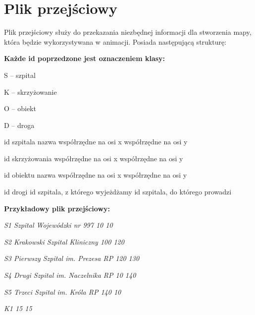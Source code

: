 ﻿\documentclass{article}
\begin{document}
\noindent 
\section{Plik przej\'{s}ciowy}

\noindent Plik przej\'{s}ciowy s{\l}u\.{z}y do przekazania niezb\k{e}dnej informacji dla stworzenia mapy, kt\'{o}ra b\k{e}dzie wykorzystywana w animacji. Posiada nast\k{e}puj\k{a}c\k{a} struktur\k{e}:

\noindent {}

\noindent \textbf{Ka\.{z}de id poprzedzone jest oznaczeniem klasy:}

\noindent {}

\noindent S -- szpital

\noindent K -- skrzy\.{z}owanie

\noindent O -- obiekt

\noindent D -- droga

\noindent {}

\noindent id szpitala {\textbar} nazwa {\textbar} wsp\'{o}{\l}rz\k{e}dne na osi x {\textbar} wsp\'{o}{\l}rz\k{e}dne na osi y

\noindent id skrzy\.{z}owania {\textbar} wsp\'{o}{\l}rz\k{e}dne na osi x {\textbar} wsp\'{o}{\l}rz\k{e}dne na osi y

\noindent id obiektu {\textbar} nazwa {\textbar} wsp\'{o}{\l}rz\k{e}dne na osi x {\textbar} wsp\'{o}{\l}rz\k{e}dne na osi y

\noindent id drogi {\textbar} id szpitala, z kt\'{o}rego wyje\.{z}d\.{z}amy {\textbar} id szpitala, do kt\'{o}rego prowadzi

\noindent {}

\noindent \textbf{Przyk{\l}adowy plik przej\'{s}ciowy:}

\noindent {}

\noindent \textit{S1 {\textbar} Szpital Wojew\'{o}dzki nr 997 {\textbar} 10 {\textbar} 10}

\noindent \textit{S2 {\textbar} Krakowski Szpital Kliniczny {\textbar} 100 {\textbar} 120}

\noindent \textit{S3 {\textbar} Pierwszy Szpital im. Prezesa RP {\textbar} 120 {\textbar} 130}

\noindent \textit{S4 {\textbar} Drugi Szpital im. Naczelnika RP {\textbar} 10 {\textbar} 140}

\noindent \textit{S5 {\textbar} Trzeci Szpital im. Kr\'{o}la RP {\textbar} 140 {\textbar} 10}

\noindent \textit{K1 {\textbar} 15 {\textbar} 15}
\end{document}
